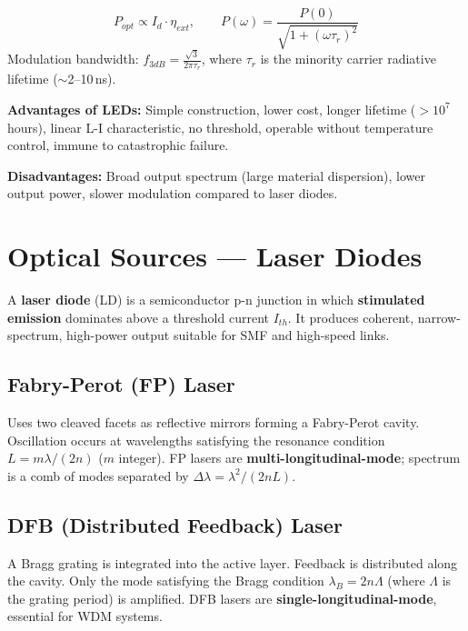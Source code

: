 \documentclass[12pt,a4paper]{article}
\begin{document}
\begin{tcolorbox}[formulabox, title={\textbf{LED Output and Modulation Bandwidth}}]
\[
P_{opt} \propto I_d \cdot \eta_{ext}, \qquad P(\omega) = \frac{P(0)}{\sqrt{1 + (\omega\tau_r)^2}}
\]
Modulation bandwidth: $f_{3dB} = \frac{\sqrt{3}}{2\pi\tau_r}$, where $\tau_r$ is the minority carrier radiative lifetime ($\sim$2--10\,ns).
\end{tcolorbox}

\textbf{Advantages of LEDs:} Simple construction, lower cost, longer lifetime ($>10^7$ hours), linear L-I characteristic, no threshold, operable without temperature control, immune to catastrophic failure.

\textbf{Disadvantages:} Broad output spectrum (large material dispersion), lower output power, slower modulation compared to laser diodes.

\section{Optical Sources --- Laser Diodes}

\begin{tcolorbox}[defbox, title={\textbf{Laser Diode}}]
A \textbf{laser diode} (LD) is a semiconductor p-n junction in which \textbf{stimulated emission} dominates above a threshold current $I_{th}$. It produces coherent, narrow-spectrum, high-power output suitable for SMF and high-speed links.
\end{tcolorbox}

\subsection{Fabry-Perot (FP) Laser}
Uses two cleaved facets as reflective mirrors forming a Fabry-Perot cavity. Oscillation occurs at wavelengths satisfying the resonance condition $L = m\lambda/(2n)$ ($m$ integer). FP lasers are \textbf{multi-longitudinal-mode}; spectrum is a comb of modes separated by $\Delta\lambda = \lambda^2/(2nL)$.

\subsection{DFB (Distributed Feedback) Laser}
A Bragg grating is integrated into the active layer. Feedback is distributed along the cavity. Only the mode satisfying the Bragg condition $\lambda_B = 2n\Lambda$ (where $\Lambda$ is the grating period) is amplified. DFB lasers are \textbf{single-longitudinal-mode}, essential for WDM systems.
\end{document}
